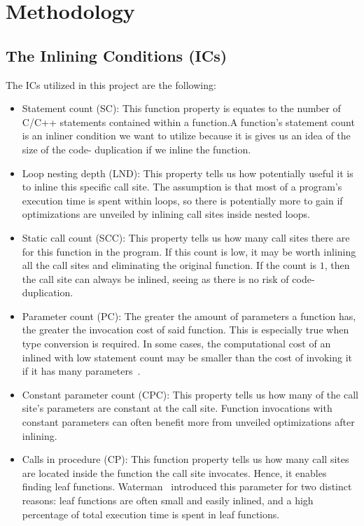 
\clearpage
\section{Methodology}
\label{sec:methodology}


\subsection{The Inlining Conditions (ICs)}
\label{sub:meth:inlining_conditions}

The ICs utilized in this project are the following:

\begin{itemize}

	\item Statement count (SC): This function property is equates to the number
of C/C++ statements contained within a function.A function's statement count is
an inliner condition we want to utilize because it is gives us an idea of the
size of the code- duplication if we inline the function.

	\item Loop nesting depth (LND): This property tells us how potentially
useful it is to inline this specific call site. The assumption is that most of a
program's execution time is spent within loops, so there is potentially more to
gain if optimizations are unveiled by inlining call sites inside nested loops.

	\item Static call count (SCC): This property tells us how many call sites
there are for this function in the program. If this count is low, it may be
worth inlining all the call sites and eliminating the original function. If the
count is $1$, then the call site can always be inlined, seeing as there is no
risk of code-duplication.

	\item Parameter count (PC): The greater the amount of parameters a function
has, the greater the invocation cost of said function. This is especially true
when type conversion is required. In some cases, the computational cost of an
inlined with low statement count may be smaller than the cost of invoking it if
it has many parameters~\cite{AdaptvCompilAndInlingWaterman}.

	\item Constant parameter count (CPC): This property tells us how many of the
call site's parameters are constant at the call site. Function invocations with
constant parameters can often benefit more from unveiled optimizations after
inlining.

	\item Calls in procedure (CP): This function property tells us how many call
sites are located inside the function the call site invocates. Hence, it enables
finding leaf functions. Waterman~\cite{AdaptvCompilAndInlingWaterman} introduced
this parameter for two distinct reasons: leaf functions are often small and
easily inlined, and a high percentage of total execution time is spent in leaf
functions.

\end{itemize}
